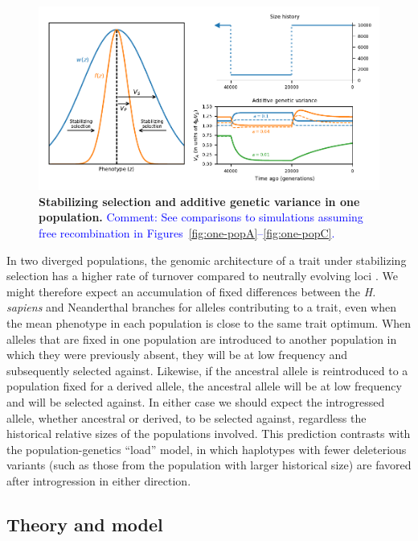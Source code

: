 \documentclass{article}
\newcommand{\aprcomment}[1]{{\textcolor{blue}{Comment: #1}}}
\begin{document}
\begin{figure}[tb!]
    \centering
    \includegraphics{../figures/one_pop.pdf}
    \caption{
        \textbf{Stabilizing selection and additive genetic variance in one population.}
        \aprcomment{See comparisons to simulations assuming free recombination in
        Figures~\ref{fig:one-popA}--\ref{fig:one-popC}.}
    }
    \label{fig:one-pop}
\end{figure}

In two diverged populations, the genomic architecture of a trait under
stabilizing selection has a higher rate of turnover compared to neutrally
evolving loci \citep{yair2022population}. We might therefore expect an
accumulation of fixed differences between the \emph{H. sapiens} and Neanderthal
branches for alleles contributing to a trait, even when the mean phenotype in
each population is close to the same trait optimum. When alleles that are fixed
in one population are introduced to another population in which they were
previously absent, they will be at low frequency and subsequently selected
against. Likewise, if the ancestral allele is reintroduced to a population
fixed for a derived allele, the ancestral allele will be at low frequency and
will be selected against. In either case we should expect the introgressed
allele, whether ancestral or derived, to be selected against, regardless the
historical relative sizes of the populations involved. This prediction
contrasts with the population-genetics ``load'' model, in which haplotypes with
fewer deleterious variants (such as those from the population with larger
historical size) are favored after introgression in either direction.


\subsection*{Theory and model}
\end{document}
